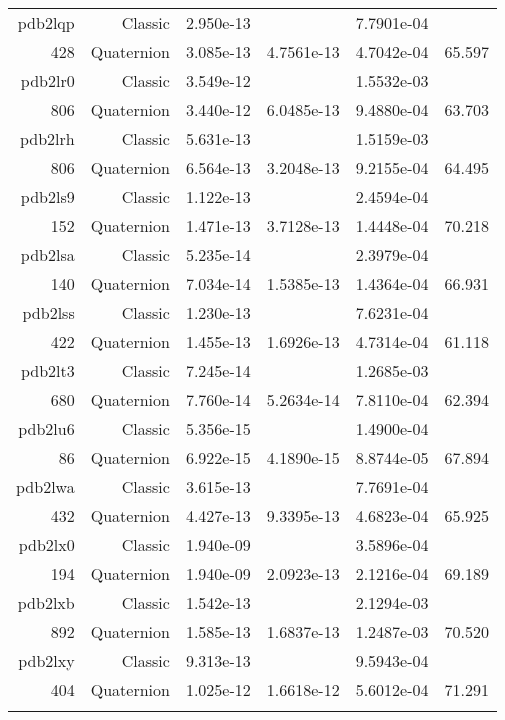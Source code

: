 \begin{xltabular}{\textwidth}{r|rS[table-format=1.3e+2]S[table-format=1.4e+2]S[table-format=1.4e+2]S[table-format=-1.3]}
pdb2lqp & Classic & 2.950e-13 &  & 7.7901e-04 & \\
428 & Quaternion & 3.085e-13 & 4.7561e-13 & 4.7042e-04 & 65.597\\  \addlinespace
pdb2lr0 & Classic & 3.549e-12 &  & 1.5532e-03 & \\
806 & Quaternion & 3.440e-12 & 6.0485e-13 & 9.4880e-04 & 63.703\\  \addlinespace
pdb2lrh & Classic & 5.631e-13 &  & 1.5159e-03 & \\
806 & Quaternion & 6.564e-13 & 3.2048e-13 & 9.2155e-04 & 64.495\\  \addlinespace
pdb2ls9 & Classic & 1.122e-13 &  & 2.4594e-04 & \\
152 & Quaternion & 1.471e-13 & 3.7128e-13 & 1.4448e-04 & 70.218\\  \addlinespace
pdb2lsa & Classic & 5.235e-14 &  & 2.3979e-04 & \\
140 & Quaternion & 7.034e-14 & 1.5385e-13 & 1.4364e-04 & 66.931\\  \addlinespace
pdb2lss & Classic & 1.230e-13 &  & 7.6231e-04 & \\
422 & Quaternion & 1.455e-13 & 1.6926e-13 & 4.7314e-04 & 61.118\\  \addlinespace
pdb2lt3 & Classic & 7.245e-14 &  & 1.2685e-03 & \\
680 & Quaternion & 7.760e-14 & 5.2634e-14 & 7.8110e-04 & 62.394\\  \addlinespace
pdb2lu6 & Classic & 5.356e-15 &  & 1.4900e-04 & \\
86 & Quaternion & 6.922e-15 & 4.1890e-15 & 8.8744e-05 & 67.894\\  \addlinespace
pdb2lwa & Classic & 3.615e-13 &  & 7.7691e-04 & \\
432 & Quaternion & 4.427e-13 & 9.3395e-13 & 4.6823e-04 & 65.925\\  \addlinespace
pdb2lx0 & Classic & 1.940e-09 &  & 3.5896e-04 & \\
194 & Quaternion & 1.940e-09 & 2.0923e-13 & 2.1216e-04 & 69.189\\  \addlinespace
pdb2lxb & Classic & 1.542e-13 &  & 2.1294e-03 & \\
892 & Quaternion & 1.585e-13 & 1.6837e-13 & 1.2487e-03 & 70.520\\  \addlinespace
pdb2lxy & Classic & 9.313e-13 &  & 9.5943e-04 & \\
404 & Quaternion & 1.025e-12 & 1.6618e-12 & 5.6012e-04 & 71.291\\  \addlinespace

\end{xltabular}
